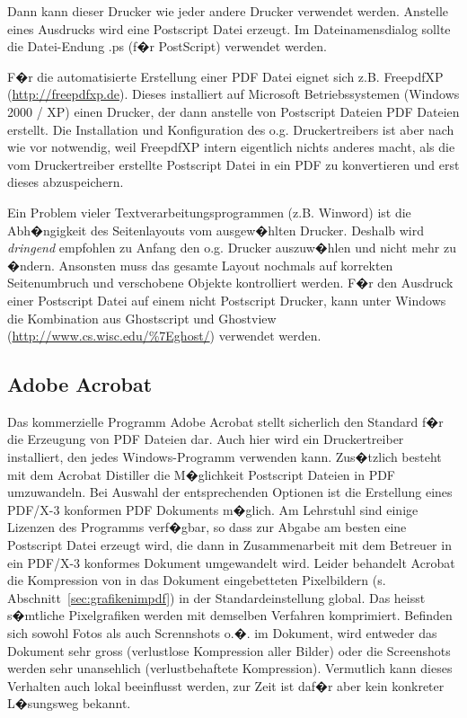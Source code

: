 Dann kann dieser Drucker wie jeder andere Drucker verwendet werden. Anstelle eines Ausdrucks wird
eine Postscript Datei erzeugt. Im Dateinamensdialog sollte die Datei-Endung .ps (f�r PostScript)
verwendet werden.

F�r die automatisierte Erstellung einer PDF Datei eignet sich z.B. FreepdfXP
({\url{http://freepdfxp.de}}). Dieses installiert auf Microsoft Betriebssystemen (Windows 2000 /
XP) einen Drucker, der dann anstelle von Postscript Dateien PDF Dateien erstellt. Die Installation
und Konfiguration des o.g. Druckertreibers ist aber nach wie vor notwendig, weil FreepdfXP intern
eigentlich nichts anderes macht, als die vom Druckertreiber erstellte Postscript Datei in ein PDF
zu konvertieren und erst dieses abzuspeichern.

Ein Problem vieler Textverarbeitungsprogrammen (z.B. Winword) ist die Abh�ngigkeit des
Seitenlayouts vom ausgew�hlten Drucker. Deshalb wird \emph{dringend} empfohlen zu Anfang den o.g.
Drucker auszuw�hlen und nicht mehr zu �ndern. Ansonsten muss das gesamte Layout nochmals auf
korrekten Seitenumbruch und verschobene Objekte kontrolliert werden. F�r den Ausdruck einer
Postscript Datei auf einem nicht Postscript Drucker, kann unter Windows die Kombination aus
Ghostscript und Ghostview (\url{http://www.cs.wisc.edu/\%7Eghost/}) verwendet werden.

\subsection{Adobe Acrobat}
Das kommerzielle Programm Adobe Acrobat stellt sicherlich den Standard f�r die Erzeugung von PDF Dateien dar. Auch hier wird ein Druckertreiber installiert, den jedes Windows-Programm verwenden kann. Zus�tzlich besteht mit dem Acrobat Distiller die M�glichkeit Postscript Dateien in PDF umzuwandeln.
Bei Auswahl der entsprechenden Optionen ist die Erstellung eines PDF/X-3 konformen PDF Dokuments m�glich. Am Lehrstuhl sind einige Lizenzen des Programms verf�gbar, so dass zur Abgabe am besten eine Postscript Datei erzeugt wird, die dann in Zusammenarbeit mit dem Betreuer in ein PDF/X-3 konformes Dokument umgewandelt wird.
Leider behandelt Acrobat die Kompression von in das Dokument eingebetteten Pixelbildern (s. Abschnitt~\ref{sec:grafikenimpdf}) in der Standardeinstellung global. Das heisst s�mtliche Pixelgrafiken werden mit demselben Verfahren komprimiert. Befinden sich sowohl Fotos als auch Scrennshots o.�. im Dokument, wird entweder das Dokument sehr gross (verlustlose Kompression aller Bilder) oder die Screenshots werden sehr unansehlich (verlustbehaftete Kompression).
Vermutlich kann dieses Verhalten auch lokal beeinflusst werden, zur Zeit ist daf�r aber kein konkreter L�sungsweg bekannt.


